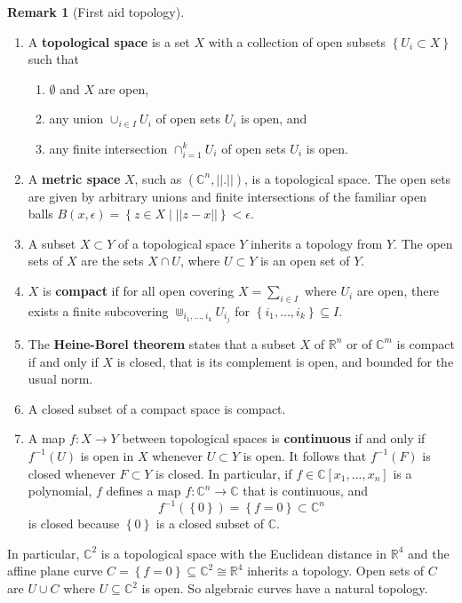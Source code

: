\documentclass{article}
\newcommand{\R}{\mathbb{R}}
\newcommand{\C}{\mathbb{C}}
\newcommand{\rb}[1]{\left( #1 \right)}
\renewcommand{\sb}[1]{\left[ #1 \right]}
\newcommand{\cb}[1]{\left\{ #1 \right\}}
\newcommand{\abs}[1]{\left\lvert #1 \right\rvert}
\theoremstyle{definition}\newtheorem{definition}{Definition}[section]
\theoremstyle{definition}\newtheorem{notation}[definition]{Notation}
\theoremstyle{definition}\newtheorem{remark}[definition]{Remark}
\theoremstyle{definition}\newtheorem{example}[definition]{Example}
\theoremstyle{definition}\newtheorem{fact}{Fact}
\theoremstyle{definition}\newtheorem{exercise}{Exercise}
\begin{document}
\begin{remark}[First aid topology]
\label{rem:2.19}
\hfill
\begin{enumerate}
\item A \textbf{topological space} is a set $ X $ with a collection of open subsets $ \cb{U_i \subset X} $ such that
\begin{enumerate}
\item $ \emptyset $ and $ X $ are open,
\item any union $ \cup_{i \in I} U_i $ of open sets $ U_i $ is open, and
\item any finite intersection $ \cap_{i = 1}^k U_i $ of open sets $ U_i $ is open.
\end{enumerate}
\item A \textbf{metric space} $ X $, such as $ \rb{\C^n, \abs{\abs{.}}} $, is a topological space. The open sets are given by arbitrary unions and finite intersections of the familiar open balls $ B\rb{x, \epsilon} = \cb{z \in X \mid \abs{\abs{z - x}}} < \epsilon $.
\item A subset $ X \subset Y $ of a topological space $ Y $ inherits a topology from $ Y $. The open sets of $ X $ are the sets $ X \cap U $, where $ U \subset Y $ is an open set of $ Y $.
\item $ X $ is \textbf{compact} if for all open covering $ X = \sum_{i \in I} $ where $ U_i $ are open, there exists a finite subcovering $ \Cup_{i_1, \dots, i_k} U_{i_j} $ for $ \cb{i_1, \dots, i_k} \subseteq I $.
\item The \textbf{Heine-Borel theorem} states that a subset $ X $ of $ \R^n $ or of $ \C^m $ is compact if and only if $ X $ is closed, that is its complement is open, and bounded for the usual norm.
\item A closed subset of a compact space is compact.
\item A map $ f : X \to Y $ between topological spaces is \textbf{continuous} if and only if $ f^{-1}\rb{U} $ is open in $ X $ whenever $ U \subset Y $ is open. It follows that $ f^{-1}\rb{F} $ is closed whenever $ F \subset Y $ is closed. In particular, if $ f \in \C\sb{x_1, \dots, x_n} $ is a polynomial, $ f $ defines a map $ f : \C^n \to \C $ that is continuous, and
$$ f^{-1}\rb{\cb{0}} = \cb{f = 0} \subset \C^n $$
is closed because $ \cb{0} $ is a closed subset of $ \C $.
\end{enumerate}
\end{remark}

In particular, $ \C^2 $ is a topological space with the Euclidean distance in $ \R^4 $ and the affine plane curve $ C = \cb{f = 0} \subseteq \C^2 \cong \R^4 $ inherits a topology. Open sets of $ C $ are $ U \cup C $ where $ U \subseteq \C^2 $ is open. So algebraic curves have a natural topology.
\end{document}
